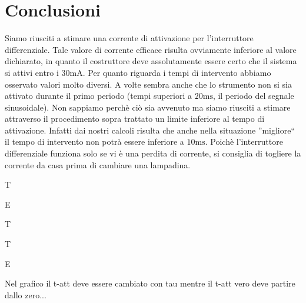 \section{Conclusioni}
Siamo riusciti a stimare una corrente di attivazione per l'interruttore differenziale. Tale valore di corrente efficace risulta ovviamente inferiore al valore dichiarato, in quanto il costruttore deve assolutamente essere certo che il sistema si attivi entro i $30\si{\milli\ampere}$. Per quanto riguarda i tempi di intervento abbiamo osservato valori molto diversi. A volte sembra anche che lo strumento non si sia attivato durante il primo periodo (tempi superiori a $20\si{\milli\second}$, il periodo del segnale sinusoidale). Non sappiamo perchè ciò sia avvenuto ma siamo riusciti a stimare attraverso il procedimento sopra trattato un limite inferiore al tempo di attivazione. Infatti dai nostri calcoli risulta che anche nella situazione ''migliore`` il tempo di intervento non potrà essere inferiore a $10\si{\milli\second}$. Poichè l'interruttore differenziale funziona solo se vi è una perdita di corrente, si consiglia di togliere la corrente da casa prima di cambiare una lampadina.

T

E

T

T

E

Nel grafico il t-att deve essere cambiato con tau mentre il t-att vero deve partire dallo zero...